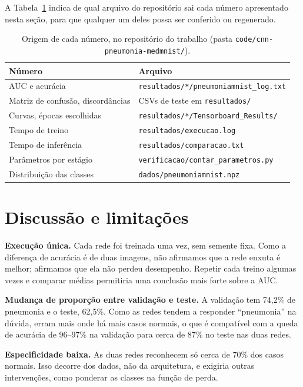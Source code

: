\documentclass[runningheads]{llncs}
\begin{document}
A Tabela~\ref{tab:rastro} indica de qual arquivo do repositório sai cada
número apresentado nesta seção, para que qualquer um deles possa ser
conferido ou regenerado.

\begin{table}[htbp]
    \centering
    \caption{Origem de cada número, no repositório do trabalho
    (pasta \texttt{code/cnn-pneumonia-medmnist/}).}
    \label{tab:rastro}
    \small
    \begin{tabular}{ll}
        \toprule
        Número & Arquivo \\
        \midrule
        AUC e acurácia & \texttt{resultados/*/pneumoniamnist\_log.txt} \\
        Matriz de confusão, discordâncias & CSVs de teste em \texttt{resultados/} \\
        Curvas, épocas escolhidas & \texttt{resultados/*/Tensorboard\_Results/} \\
        Tempo de treino & \texttt{resultados/execucao.log} \\
        Tempo de inferência & \texttt{resultados/comparacao.txt} \\
        Parâmetros por estágio & \texttt{verificacao/contar\_parametros.py} \\
        Distribuição das classes & \texttt{dados/pneumoniamnist.npz} \\
        \bottomrule
    \end{tabular}
\end{table}

\section{Discussão e limitações}

\textbf{Execução única.} Cada rede foi treinada uma vez, sem semente fixa.
Como a diferença de acurácia é de duas imagens, não afirmamos que a rede
enxuta é melhor; afirmamos que ela não perdeu desempenho. Repetir cada
treino algumas vezes e comparar médias permitiria uma conclusão mais
forte sobre a AUC.

\textbf{Mudança de proporção entre validação e teste.} A validação tem
74,2\% de pneumonia e o teste, 62,5\%. Como as redes tendem a responder
``pneumonia'' na dúvida, erram mais onde há mais casos normais, o que é
compatível com a queda de acurácia de 96--97\% na validação para
cerca de 87\% no teste nas duas redes.

\textbf{Especificidade baixa.} As duas redes reconhecem só cerca de 70\%
dos casos normais. Isso decorre dos dados, não da arquitetura, e
exigiria outras intervenções, como ponderar as classes na função de perda.
\end{document}
